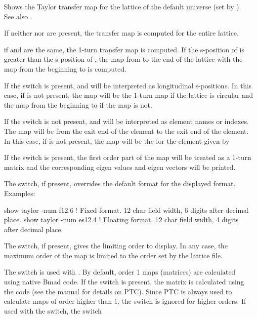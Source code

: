 {{{{{{{{{{Shows the Taylor transfer map for the  lattice of the default universe (set by
).  See also .

If neither  nor  are present, the transfer map is computed for the
entire lattice.

if  and  are the same, the 1-turn transfer map is computed. If the
s-position of  is greater than the s-position of , the map from
 to the end of the lattice with the map from the beginning to  is
computed.

If the  switch is present,  and  will be interpreted as longitudinal
s-positions. In this case, if  is not present, the map will be the 1-turn map if the
lattice is circular and the map from the beginning to  if the map is not.

If the  switch is not present,  and  will be interpreted as element names
or indexes. The map will be from the exit end of the  element to the exit end of the
 element. In this case, if  is not present, the map will be the for the element
given by 

If the  switch is present, the first order part of the map will be treated
as a 1-turn matrix and the corresponding eigen values and eigen vectors will be printed.

The  switch, if present, overrides the default format for the displayed format.
Examples:
\begin{example}
  show taylor -num f12.6  ! Fixed format. 12 char field width, 6 digits after decimal place.
  show taylor -num es12.4 ! Floating format. 12 char field width, 4 digits after decimal place.
\end{example}

The  switch, if present, gives the limiting order to display. In any case, the
maximum order of the map is limited to the order set by the lattice file.

The  switch is used with . By default, order 1 maps (matrices) are calculated
using native Bmad code. If the  switch is present, the matrix is calculated using the
 code (see the \bmad manual for details on PTC). Since PTC is always used to calculate maps
of order higher than 1, the  switch is ignored for higher orders. If used with the
 switch, the  switch 

}}}}}}}}}}
